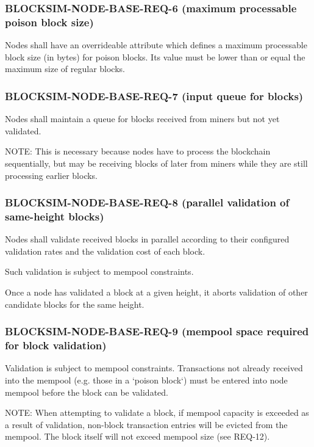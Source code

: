 \documentclass{scrreprt}
\begin{document}
      \subsubsection{BLOCKSIM-NODE-BASE-REQ-6 (maximum processable poison block size)}

        Nodes shall have an overrideable attribute which defines a maximum
        processable block size (in bytes) for poison blocks.
        Its value must be lower than or equal the maximum size of regular blocks.

      \subsubsection{BLOCKSIM-NODE-BASE-REQ-7 (input queue for blocks)}

        Nodes shall maintain a queue for blocks received from miners but not
        yet validated.

        NOTE: This is necessary because nodes have to process the blockchain
        sequentially, but may be receiving blocks of later from miners while
        they are still processing earlier blocks.

      \subsubsection{BLOCKSIM-NODE-BASE-REQ-8 (parallel validation of same-height blocks)}

        Nodes shall validate received blocks in parallel according to their
        configured validation rates and the validation cost of each block.

        Such validation is subject to mempool constraints.

        Once a node has validated a block at a given height, it aborts
        validation of other candidate blocks for the same height.

      \subsubsection{BLOCKSIM-NODE-BASE-REQ-9 (mempool space required for block validation)}

        Validation is subject to mempool constraints.
        Transactions not already received into the mempool (e.g. those in a
        `poison block`) must be entered into node mempool before the block
        can be validated.

        NOTE: When attempting to validate a block, if mempool capacity is
        exceeded as a result of validation, non-block transaction entries
        will be evicted from the mempool.  The block itself will not
        exceed mempool size (see REQ-12).
\end{document}
